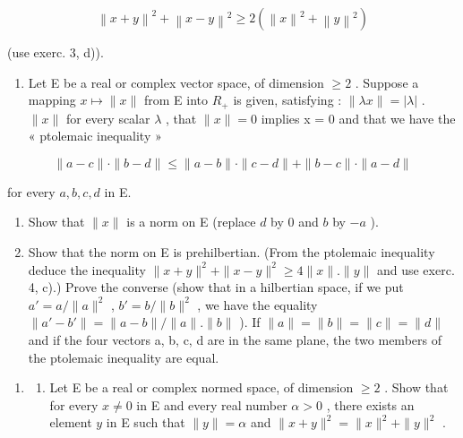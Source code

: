 \[
\left\| x + y \right\| ^ {2} + \left\| x - y \right\| ^ {2} \geqslant 2 \left(\left\| x \right\| ^ {2} + \left\| y \right\| ^ {2}\right)
\]

(use exerc. 3, d)).

\begin{enumerate}
\def\labelenumi{\arabic{enumi})}
\setcounter{enumi}{4}
\tightlist
\item
  Let E be a real or complex vector space, of dimension \(\geqslant 2\) . Suppose a mapping \(x \mapsto \|x\|\) from E into \(R_{+}\) is given, satisfying : \(\|\lambda x\| = |\lambda|\) . \(\|x\|\) for every scalar \(\lambda\) , that \(\|x\| = 0\) implies x = 0 and that we have the « ptolemaic inequality »
\end{enumerate}

\[
\| a - c \| \cdot \| b - d \| \leqslant \| a - b \| \cdot \| c - d \| + \| b - c \| \cdot \| a - d \|
\]

for every \(a, b, c, d\) in E.

\begin{enumerate}
\def\labelenumi{\alph{enumi})}
\item
  Show that \(\| x\|\) is a norm on E (replace \(d\) by 0 and \(b\) by \(-a\) ).
\item
  Show that the norm on E is prehilbertian. (From the ptolemaic inequality deduce the inequality \(\|x+y\|^{2}+\|x-y\|^{2}\geqslant4\|x\|. \|y\|\) and use exerc. 4, c).) Prove the converse (show that in a hilbertian space, if we put \(a' = a/\|a\|^{2}\) , \(b' = b/\|b\|^{2}\) , we have the equality \(\|a'-b'\|=\|a-b\|/\|a\|. \|b\|\) ). If \(\|a\|=\|b\|=\|c\|=\|d\|\) and if the four vectors a, b, c, d are in the same plane, the two members of the ptolemaic inequality are equal.
\end{enumerate}

\begin{enumerate}
\def\labelenumi{\arabic{enumi})}
\setcounter{enumi}{5}
\tightlist
\item
  \begin{enumerate}
  \def\labelenumii{\alph{enumii})}
  \tightlist
  \item
    Let E be a real or complex normed space, of dimension \(\geqslant 2\) . Show that for every \(x \neq 0\) in E and every real number \(\alpha > 0\) , there exists an element \(y\) in E such that \(\| y \| = \alpha\) and \(\| x + y \|^2 = \| x \|^2 + \| y \|^2\) .
  \end{enumerate}
\end{enumerate}

